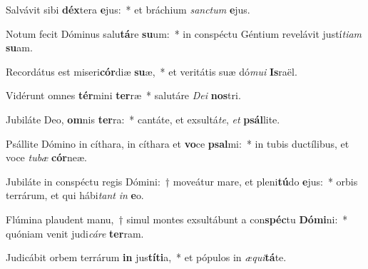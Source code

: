 \item Salvávit sibi \textbf{déx}tera \textbf{e}jus:~* et bráchium \textit{sanc}\textit{tum} \textbf{e}jus.
\item Notum fecit Dóminus salu\textbf{tá}re \textbf{su}um:~* in conspéctu Géntium revelávit justí\textit{ti}\textit{am} \textbf{su}am.
\item Recordátus est miseri\textbf{cór}diæ \textbf{su}æ,~* et veritátis suæ dó\textit{mu}\textit{i} \textbf{Is}raël.
\item Vidérunt omnes \textbf{tér}mini \textbf{ter}ræ~* salutáre \textit{De}\textit{i} \textbf{nos}tri.
\item Jubiláte Deo, \textbf{om}nis \textbf{ter}ra:~* cantáte, et exsultá\textit{te}, \textit{et} \textbf{psál}lite.
\item Psállite Dómino in cíthara, in cíthara et \textbf{vo}ce \textbf{psal}mi:~* in tubis ductílibus, et voce \textit{tu}\textit{bæ} \textbf{cór}neæ.
\item Jubiláte in conspéctu regis Dómini:~† moveátur mare, et pleni\textbf{tú}do \textbf{e}jus:~* orbis terrárum, et qui hábi\textit{tant} \textit{in} \textbf{e}o.
\item Flúmina plaudent manu,~† simul montes exsultábunt a con\textbf{spéc}tu \textbf{Dó}\textbf{mi}ni:~* quóniam venit judi\textit{cá}\textit{re} \textbf{ter}ram.
\item Judicábit orbem terrárum \textbf{in} jus\textbf{tí}\textbf{ti}a,~* et pópulos in \textit{æ}\textit{qui}\textbf{tá}te.
